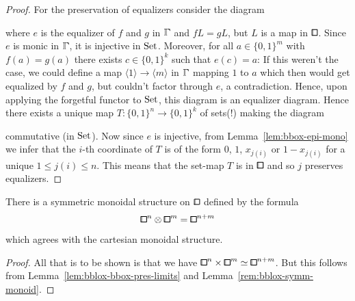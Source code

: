 \begin{proof}
For the preservation of equalizers consider the diagram
\begin{center}
\end{center}
where $e$ is the equalizer of $f$ and $g$ in $\bbGamma$
and $fL = gL$, but $L$ is a map in $\bbox$.
Since $e$ is monic in $\bbGamma$, it is injective in $\mathrm{Set}$.
Moreover, for all $a\in\{0,1\}^m$ with $f(a) = g(a)$ there exists $c\in\{0,1\}^k$ such that $e(c) = a$:
If this weren't the case, we could define a map $\langle 1\rangle\to\langle m\rangle$ in $\bbGamma$ mapping $1$ to $a$
which then would get equalized by $f$ and $g$, but couldn't factor through $e$, a contradiction.
Hence, upon applying the forgetful functor to $\mathrm{Set}$,
this diagram is an equalizer diagram.
Hence there exists a unique map $T\colon\{0,1\}^n\to\{0,1\}^k$ of sets(!) making the diagram
\begin{center}
\end{center}
commutative (in $\mathrm{Set}$).
Now since $e$ is injective, from Lemma~\ref{lem:bbox-epi-mono} we infer that the $i$-th coordinate of $T$ is of the form $0$, $1$, $x_{j(i)}$ or $1-x_{j(i)}$ for a unique $1\leq j(i)\leq n$.
This means that the set-map $T$ is in $\bbox$ and so $j$ preserves equalizers.
\end{proof}


\begin{corollary}\label{prop:bbox-symm-monoid}
There is a symmetric monoidal structure on $\bbox$ defined by the formula
\[
    {\bbox}^n\otimes{\bbox}^m={\bbox}^{n+m}
\]
which agrees with the cartesian monoidal structure.
\end{corollary}

\begin{proof}
All that is to be shown is that we have ${\bbox}^n\times{\bbox}^m\simeq{\bbox}^{n+m}$.
But this follows from Lemma~\ref{lem:bblox-bbox-pres-limits} and Lemma~\ref{rem:bblox-symm-monoid}.
\end{proof}

